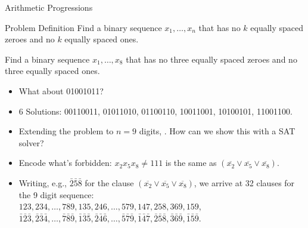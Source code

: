 \documentclass[t]{sdqbeamer}
\begin{document}
\begin{frame}{Arithmetic Progressions}
\begin{block}{Problem Definition}
	Find a binary sequence $x_1, \dots, x_n$ that has no $k$ equally spaced zeroes and no $k$ equally spaced ones.
\end{block}
\pause
\begin{example}[$n=8, k=3$]
Find a binary sequence $x_1,\dots,x_8$ that has no three equally spaced zeroes and no three equally spaced ones.
\begin{itemize}
\item<2-> What about 01001011? 
\item<4-> 6 Solutions: 00110011, 01011010, 01100110, 10011001, 10100101, 11001100.
\item<5-> Extending the problem to $n=9$ digits, . How can we show this with a SAT solver?
\item<6-> Encode what's forbidden: $x_2 x_5 x_8 \neq 111$ is the same as
   $(\overline{x_2} \lor \overline{x_5} \lor \overline{x_8})$.
\item<7-> Writing, e.g., $\bar 2 \bar 5 \bar 8$ for the clause $(\overline{x_2} \lor \overline{x_5} \lor \overline{x_8})$, we arrive
  at 32 clauses for the 9 digit sequence: \\
  $123, 234, \dots, 789, 135, 246, \dots, 579, 147, 258, 369, 159$,
  $\bar 1 \bar 2 \bar 3, \bar 2 \bar 3 \bar 4, \dots, \bar 7 \bar 8 \bar 9, \bar 1 \bar 3 \bar 5, \bar 2 \bar 4 \bar 6, 
  \dots, \bar 5 \bar 7 \bar 9, \bar 1 \bar 4 \bar 7, \bar 2 \bar 5 \bar 8, \bar 3 \bar 6 \bar 9, \bar 1 \bar 5 \bar 9$.
\end{itemize}
\end{example}
\end{frame}
\end{document}
